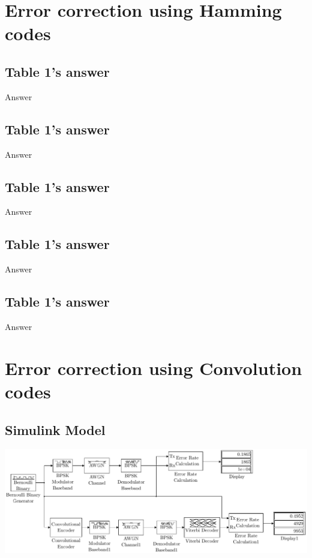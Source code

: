 \documentclass[11pt]{article}
\begin{document}
\section{Error correction using Hamming codes}
\subsection{Table 1's answer}
Answer
\subsection{Table 1's answer}
Answer
\subsection{Table 1's answer}
Answer
\subsection{Table 1's answer}
Answer
\subsection{Table 1's answer}
Answer


\section{Error correction using Convolution codes}
\subsection{Simulink Model}
\begin{center}
    \includegraphics[width=.8\textwidth]{q6-model.pdf}
    \label{fig:q6-model}
\end{center}
\end{document}
